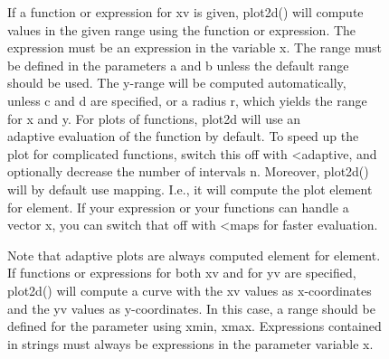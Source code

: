 \begin{eulernotebook}
\begin{eulercomment}
If a function or expression for xv is given, plot2d() will compute\\
values in the given range using the function or expression. The\\
expression must be an expression in the variable x. The range must\\
be defined in the parameters a and b unless the default range\\
[-2,2] should be used. The y-range will be computed automatically,\\
unless c and d are specified, or a radius r, which yields the range\\
[-r,r] for x and y. For plots of functions, plot2d will use an\\
adaptive evaluation of the function by default. To speed up the\\
plot for complicated functions, switch this off with \textless{}adaptive, and\\
optionally decrease the number of intervals n. Moreover, plot2d()\\
will by default use mapping. I.e., it will compute the plot element\\
for element. If your expression or your functions can handle a\\
vector x, you can switch that off with \textless{}maps for faster evaluation.

Note that adaptive plots are always computed element for element. \\
If functions or expressions for both xv and for yv are specified,\\
plot2d() will compute a curve with the xv values as x-coordinates\\
and the yv values as y-coordinates. In this case, a range should be\\
defined for the parameter using xmin, xmax. Expressions contained\\
in strings must always be expressions in the parameter variable x.
\end{eulercomment}
\end{eulernotebook}

